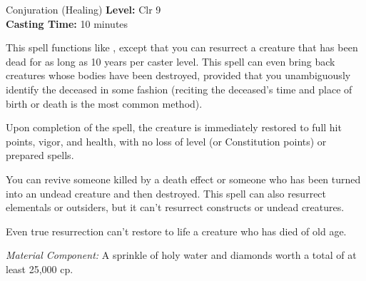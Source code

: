 {Conjuration (Healing)}
{
	\textbf{Level:}
	Clr 9\\
	\textbf{Casting Time:}
	10 minutes\\
}
{
	This spell functions like , except that you can resurrect a creature that has been dead for as long as 10 years per caster level. This spell can even bring back creatures whose bodies have been destroyed, provided that you unambiguously identify the deceased in some fashion (reciting the deceased's time and place of birth or death is the most common method).

	Upon completion of the spell, the creature is immediately restored to full hit points, vigor, and health, with no loss of level (or Constitution points) or prepared spells.

	You can revive someone killed by a death effect or someone who has been turned into an undead creature and then destroyed. This spell can also resurrect elementals or outsiders, but it can't resurrect constructs or undead creatures.

	Even true resurrection can't restore to life a creature who has died of old age.

	\textit{Material Component:}
	A sprinkle of holy water and diamonds worth a total of at least 25,000 cp.

}
